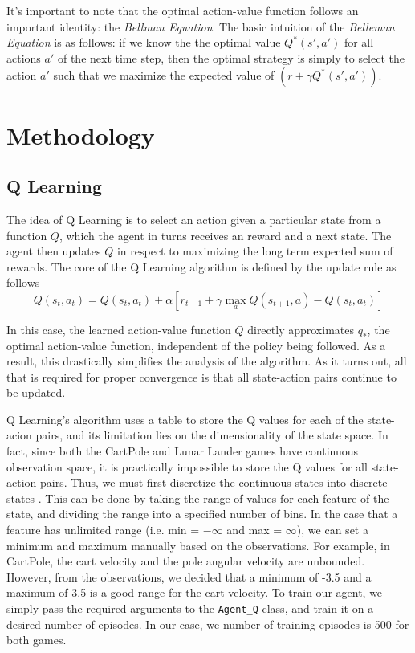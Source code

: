 \documentclass{article}
\begin{document}
It's important to note that the optimal action-value function follows an
important identity: the \emph{Bellman Equation}. The basic intuition of the
\emph{Belleman Equation} is as follows: if we know the the optimal value
\(Q^*(s',a')\) for all actions \(a'\) of the next time step, then the optimal
strategy is simply to select the action \(a'\) such that we maximize the
expected value of \((r + \gamma Q^*(s',a'))\).
\section{Methodology}
\subsection{Q Learning}
The idea of Q Learning is to select an action given a particular state from a
function \(Q\), which the agent in turns receives an reward and a next state.
The agent then updates \(Q\) in respect to maximizing the long term expected
sum of rewards. The core of the Q Learning algorithm is defined by the update
rule as follows
\begin{equation}
      Q(s_t, a_t) = Q(s_t, a_t) + \alpha \left[r_{t+1} + \gamma \max_{a} Q(s_{t+1}, a) - Q(s_t, a_t)\right]
      \label{eq:q_update_rule}
\end{equation}

In this case, the learned action-value function \(Q\) directly approximates
\(q_*\), the optimal action-value function, independent of the policy being
followed. As a result, this drastically simplifies the analysis of the
algorithm. As it turns out, all that is required for proper convergence is that
all state-action pairs continue to be updated\cite{sutton}.

Q Learning's algorithm uses a table to store the Q values for each of the
state-acion pairs, and its limitation lies on the dimensionality of the state
space. In fact, since both the CartPole and Lunar Lander games have continuous
observation space, it is practically impossible to store the Q values for all
state-action pairs. Thus, we must first discretize the continuous states into
discrete states \cite{discretization}. This can be done by taking the range of
values for each feature of the state, and dividing the range into a specified
number of bins. In the case that a feature has unlimited range (i.e. min =
\(-\infty\) and max = \(\infty\)), we can set a minimum and maximum manually
based on the observations. For example, in CartPole, the cart velocity and the
pole angular velocity are unbounded. However, from the observations, we decided
that a minimum of -3.5 and a maximum of 3.5 is a good range for the cart
velocity. To train our agent, we simply pass the required arguments to the
\verb+Agent_Q+ class, and train it on a desired number of episodes. In our
case, we number of training episodes is 500 for both games.
\end{document}
